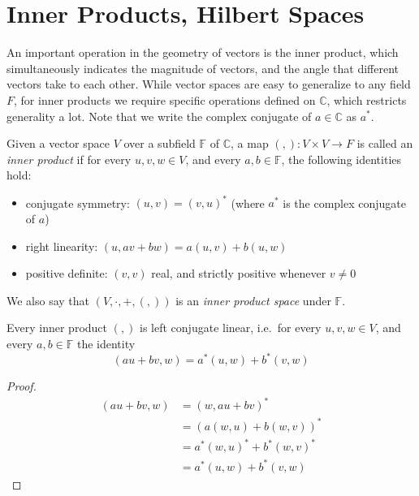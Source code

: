 \section{Inner Products, Hilbert Spaces}\label{inner-products}
An important operation in the geometry of vectors is the inner product, which simultaneously indicates the magnitude of vectors, and the angle that different vectors take to each other. While vector spaces are easy to generalize to any field $F$, for inner products we require specific operations defined on $\mathbb{C}$, which restricts generality a lot. Note that we write the complex conjugate of $a \in \mathbb{C}$ as $a^*$.

\begin{define}
	Given a vector space $V$ over a subfield $\mathbb{F}$ of $\mathbb{C}$, a map $(,): V \times V \to F$ is called an \emph{inner product} if for every $u, v, w \in V$, and every $a, b \in \mathbb{F}$, the following identities hold:
	\begin{itemize}
		\item conjugate symmetry: $(u, v) = (v, u)^*$ (where $a^*$ is the complex conjugate of $a$)
		\item right linearity: $(u, av+bw) = a(u, v) + b(u, w)$
		\item positive definite: $(v, v)$ real, and strictly positive whenever $v \neq 0$
	\end{itemize}
	We also say that $(V, \cdot, +, (,))$ is an \emph{inner product space} under $\mathbb{F}$.
\end{define}

\begin{prop}
	Every inner product $(,)$ is left conjugate linear, i.e.\ for every $u, v, w \in V$, and every $a, b \in \mathbb{F}$ the identity
	\[(au+bv,w) = a^*(u,w) + b^*(v,w)\]
\end{prop}
\begin{proof}
	\begin{align*}
		(au+bv,w)
		&= (w,au+bv)^*
		\\&= (a(w,u)+b(w,v))^*
		\\&= a^*(w,u)^*+b^*(w,v)^*
		\\&= a^*(u,w)+b^*(v,w)
	\end{align*}
\end{proof}

